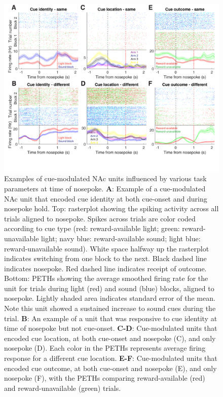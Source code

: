 \documentclass[11pt]{article}
\newcommand{\bsf}[1]{\textbf{#1}}
\providecommand{\DIFadd}[1]{{\protect\color{blue}\uwave{#1}}} %
\providecommand{\DIFaddFL}[1]{\DIFadd{#1}} %
\providecommand{\DIFaddbeginFL}{} %
\providecommand{\DIFaddendFL}{} %
\newcommand{\DIFaddincludegraphics}[2][]{{\color{blue}\fbox{\DIFOincludegraphics[#1]{#2}}}} %
\DeclareRobustCommand{\DIFaddbeginFL}{\DIFOaddbeginFL \let\includegraphics\DIFaddincludegraphics} %
\DeclareRobustCommand{\DIFaddendFL}{\DIFOaddendFL \let\includegraphics\DIFOincludegraphics} %
\begin{document}
{\begin{figure}[h]
\centering
\includegraphics[width=\textwidth]{Fig 9 - NP Neural examples.png}
\caption{Examples of cue-modulated NAc units influenced by various task
parameters at time of nosepoke. \bsf{A}: Example of a cue-modulated NAc unit
that encoded cue identity at both cue-onset and during nosepoke hold. Top:
rasterplot showing the spiking activity across all trials aligned to
nosepoke. Spikes across trials are color coded according to cue type (red:
reward-available light; green: reward-unavailable light; navy blue:
reward-available sound; light blue: reward-unavailable sound). White space
halfway up the rasterplot indicates switching from one block to the
next. Black dashed line indicates nosepoke. Red dashed line indicates receipt
of outcome. Bottom: PETHs showing the average smoothed firing rate for the
unit for trials during light (red) and sound (blue) blocks, aligned to
nosepoke. Lightly shaded area indicates standard error of the mean. Note this
unit showed a sustained increase \DIFaddbeginFL \DIFaddFL{in firing }\DIFaddendFL to sound cues during the trial. \bsf{B}: An
example of a unit that was responsive to cue identity at time of nosepoke but
not cue-onset. \bsf{C-D}: Cue-modulated units that encoded cue location, at
both cue-onset and nosepoke (C), and only nosepoke (D). Each color in the
PETHs represents average firing response for a different cue
location. \bsf{E-F}: Cue-modulated units that encoded cue outcome, at both
cue-onset and nosepoke (E), and only nosepoke (F), with the PETHs comparing
reward-available (red) and reward-unavailable (green) trials.}
\label{fig:NP_examples}
\end{figure}

}
\end{document}
